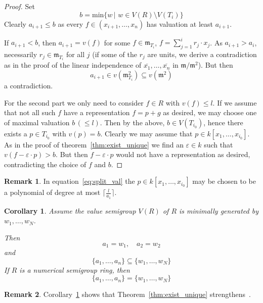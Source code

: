 \documentclass[12pt]{amsart}
\theoremstyle{plain}%
\newtheorem{Corollary}[satz]{Corollary}
\theoremstyle{definition}
\newtheorem{notiz}{Remark}[section]
\renewcommand{\(}{\left(}
\renewcommand{\)}{\right)}
\renewcommand{\leq}{\leqslant}
\begin{document}
\begin{proof}
Set 
	$$ b =  \mathrm{min} \{ w \,\vert \,\, w \in V(R) 
    \setminus V(T_i) \} $$
Clearly $a_{i+1} \leq b$ as every $f \in (x_{i+1}, \ldots, 
x_n)$ has valuation at least $a_{i+1}$. 

If $a_{i+1} < b$, then $a_{i+1} = v(f)$ for some 
$f \in \mathfrak m_{T_i}$, 
$f = \sum\limits_{j=1}^{i} r_j \cdot x_j$. As 
$a_{i+1} > a_i$, necessarily $r_j \in \mathfrak m_{T_i}$ 
for all $j$ (if some of the $r_j$ are units, we derive a 
contradiction as in the proof of the linear independence of 
$\overline{x_1}, \ldots, \overline{x_n}$ in 
$\mathfrak m/\mathfrak m^2$). But then 
	$$ a_{i+1} \in v(\mathfrak m_{T_i}^2) \subseteq 
    v(\mathfrak m^2) $$
a contradiction. 

For the second part we only need to consider $f \in R$ with 
$v(f) \leq l$. If we assume that not all such $f$ have a 
representation $f = p+g$ as desired, we may choose one of maximal 
valuation $b \, (\leq l)$. Then by the above, 
$b \in V(T_{i_0})$, hence there exists a $p \in T_{i_0}$ 
with $v(p) = b$. Clearly we may assume 
that $p \in k[x_1, \ldots, x_{i_0}]$. As in the proof of 
theorem~\ref{thm:exist_unique} 
we find an $\varepsilon \in k$ such that 
$v(f - \varepsilon \cdot p) > b$. But then 
$f - \varepsilon \cdot p$ would not have a representation as 
desired, contradicting the choice of $f$ and $b$. 
\end{proof}

\begin{notiz}
In equation~\eqref{eq:split_val} the $p \in k[x_1, \ldots, 
x_{i_0}]$ may be chosen to be a polynomial of degree at 
most $\lceil \frac {l}{a_1} \rceil$. 
\end{notiz}


\begin{Corollary}\label{cor:ai_value_sgr}
Assume the value semigroup $V(R)$ of $R$ is minimally 
generated by $w_1, \ldots, w_N$. 

Then 
	$$ a_1 = w_1, \quad a_2 = w_2 $$
and 
	\begin{equation}\label{eq:incl_ai_sgr} 
	\{a_1, \ldots, a_n\} \subseteq \{w_1, \ldots, w_N\} 
	\end{equation}
If $R$ is a numerical semigroup ring, then 
	$$ \{a_1, \ldots, a_n\} = \{w_1, \ldots, w_N\} $$
\end{Corollary}

\begin{notiz}
Corollary~\ref{cor:ai_value_sgr} shows that 
Theorem~\ref{thm:exist_unique} 
strengthens~\cite[3.6]{HK}.
\end{notiz}
\end{document}
